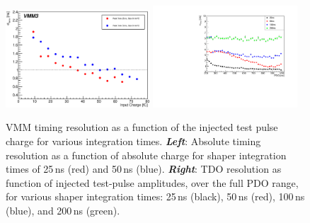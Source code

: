 \begin{figure}[!htb]
    \begin{center}
        \includegraphics[width=0.48\textwidth]{figures/nsw/calibration/res_v_charge}
        \includegraphics[width=0.48\textwidth]{figures/nsw/calibration/nsw_time_res}
        \caption{
            VMM timing resolution as a function of the injected test pulse charge
            for various integration times.
            \textbf{\textit{Left}}: Absolute timing resolution as a function of absolute charge
                for shaper integration times of 25\,ns (red) and 50\,ns (blue).
            \textbf{\textit{Right}}: TDO resolution as function of injected test-pulse
                amplitudes, over the full PDO range, for various shaper integration times: 25\,ns (black), 50\,ns (red),
                100\,ns (blue), and 200\,ns (green).
        }
        \label{fig:time_res}
    \end{center}
\end{figure}



